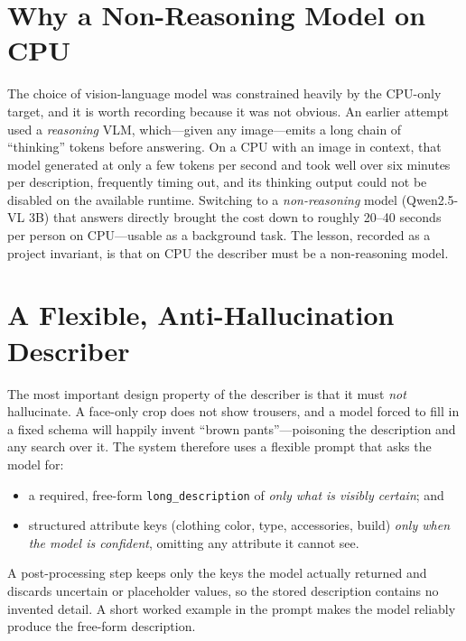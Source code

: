 \documentclass[12pt]{report}
\begin{document}
\section{Why a Non-Reasoning Model on CPU}
The choice of vision-language model was constrained heavily by the CPU-only target, and it is worth recording because it was not obvious. An earlier attempt used a \emph{reasoning} VLM, which---given any image---emits a long chain of ``thinking'' tokens before answering. On a CPU with an image in context, that model generated at only a few tokens per second and took well over six minutes per description, frequently timing out, and its thinking output could not be disabled on the available runtime. Switching to a \emph{non-reasoning} model (Qwen2.5-VL 3B) that answers directly brought the cost down to roughly 20--40 seconds per person on CPU---usable as a background task. The lesson, recorded as a project invariant, is that on CPU the describer must be a non-reasoning model.

\section{A Flexible, Anti-Hallucination Describer}
The most important design property of the describer is that it must \emph{not} hallucinate. A face-only crop does not show trousers, and a model forced to fill in a fixed schema will happily invent ``brown pants''---poisoning the description and any search over it. The system therefore uses a flexible prompt that asks the model for:
\begin{itemize}
    \item a required, free-form \texttt{long\_description} of \emph{only what is visibly certain}; and
    \item structured attribute keys (clothing color, type, accessories, build) \emph{only when the model is confident}, omitting any attribute it cannot see.
\end{itemize}
A post-processing step keeps only the keys the model actually returned and discards uncertain or placeholder values, so the stored description contains no invented detail. A short worked example in the prompt makes the model reliably produce the free-form description.
\end{document}
